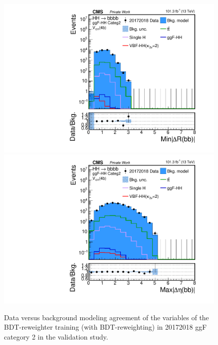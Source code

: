 \begin{figure}[htbp!]
\begin{center}
\includegraphics[width=0.24\linewidth]{Figures/Modeling/background/plotsDatadrivenWithBDT/20172018/GGFcateg2_CR_210/Histogram/plot20172018_min_4b_deltaR_Btag4_GGFcateg2_CR_210_Histogram_log.pdf}
\includegraphics[width=0.24\linewidth]{Figures/Modeling/background/plotsDatadrivenWithBDT/20172018/GGFcateg2_CR_210/Histogram/plot20172018_max_4b_deltaEta_Btag4_GGFcateg2_CR_210_Histogram_log.pdf}
\end{center}
\caption{Data versus background modeling agreement of the variables of the BDT-reweighter training (with BDT-reweighting) in 20172018 ggF category 2 in the validation study.}
\label{bkg:fig:valbdtregvarggf2_20172018}
\end{figure}

